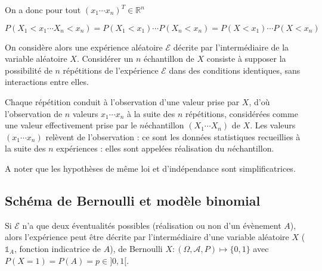 \documentclass[letterpaper,10pt,english]{jupyterBook}
\begin{document}
\sphinxAtStartPar
On a donc pour tout \((x_1\cdots x_n)^T\in\mathbb{R}^n\)

\sphinxAtStartPar
\(P(X_1<x_1\cdots X_n<x_n)=P(X_1<x_1)\cdots P(X_n<x_n)=P(X<x_1)\cdots P(X<x_n)\)

\sphinxAtStartPar
On considère alors une expérience aléatoire \(\mathcal E\) décrite par l’intermédiaire de la variable aléatoire \(X\). Considérer un \(n\) échantillon de \(X\) consiste à supposer la possibilité de \(n\) répétitions de l’expérience \(\mathcal E\) dans des conditions identiques, sans interactions entre elles.

\sphinxAtStartPar
Chaque répétition conduit à l’observation d’une valeur prise par \(X\), d’où l’observation de \(n\) valeurs \(x_1\cdots x_n\) à la suite des \(n\) répétitions, considérées comme une valeur effectivement prise par le \(n\)\sphinxhyphen{}échantillon \((X_1\cdots X_n)\) de \(X\). Les valeurs \((x_1\cdots x_n)\)  relèvent de l’observation : ce sont les données statistiques recueillies à la suite des \(n\) expériences : elles sont appelées réalisation du \(n\)\sphinxhyphen{}échantillon.

\sphinxAtStartPar
A noter que les hypothèses de même loi et d’indépendance sont simplificatrices.


\subsection{Schéma de Bernoulli et modèle binomial}
\label{\detokenize{elemstats:schema-de-bernoulli-et-modele-binomial}}
\sphinxAtStartPar
Si \(\mathcal E\) n’a que deux éventualités possibles (réalisation ou non d’un évènement \(A\)), alors l’expérience peut être décrite par l’intermédiaire d’une variable aléatoire \(X\) (\(\mathbb{1}_A\), fonction indicatrice de \(A\)), de Bernoulli \(X:(\Omega,\mathcal A,P)\mapsto \{0,1\}\) avec \(P(X=1)=P(A)=p\in]0,1[\).
\end{document}
